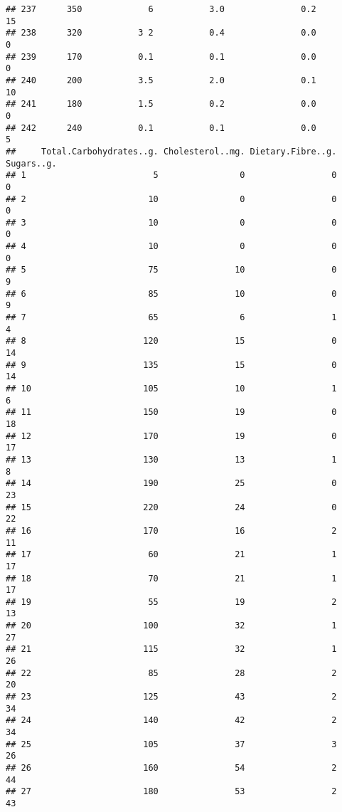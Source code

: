 \documentclass[
]{article}
\begin{document}
\begin{verbatim}
## 237      350             6           3.0               0.2          15
## 238      320           3 2           0.4               0.0           0
## 239      170           0.1           0.1               0.0           0
## 240      200           3.5           2.0               0.1          10
## 241      180           1.5           0.2               0.0           0
## 242      240           0.1           0.1               0.0           5
##     Total.Carbohydrates..g. Cholesterol..mg. Dietary.Fibre..g. Sugars..g.
## 1                         5                0                 0          0
## 2                        10                0                 0          0
## 3                        10                0                 0          0
## 4                        10                0                 0          0
## 5                        75               10                 0          9
## 6                        85               10                 0          9
## 7                        65                6                 1          4
## 8                       120               15                 0         14
## 9                       135               15                 0         14
## 10                      105               10                 1          6
## 11                      150               19                 0         18
## 12                      170               19                 0         17
## 13                      130               13                 1          8
## 14                      190               25                 0         23
## 15                      220               24                 0         22
## 16                      170               16                 2         11
## 17                       60               21                 1         17
## 18                       70               21                 1         17
## 19                       55               19                 2         13
## 20                      100               32                 1         27
## 21                      115               32                 1         26
## 22                       85               28                 2         20
## 23                      125               43                 2         34
## 24                      140               42                 2         34
## 25                      105               37                 3         26
## 26                      160               54                 2         44
## 27                      180               53                 2         43

\end{verbatim}
\end{document}
